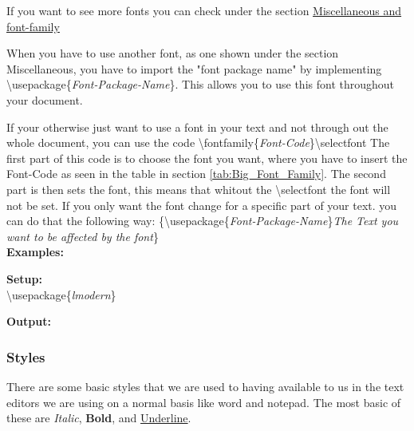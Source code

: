 \documentclass{article}
\newcommand{\bs}[1]{\textbackslash{}#1} %
\begin{document}
If you want to see more fonts you can check under the section  \hyperref[secc:font-family-sheet]{Miscellaneous and font-family}

When you have to use another font, as one shown under the section Miscellaneous, you have to import the "font package name" by implementing \bs{usepackage\{\textit{Font-Package-Name}\}}.
This allows you to use this font throughout your document.

If your otherwise just want to use a font in your text and not through out the whole document, you can use the code \bs{fontfamily\{\textit{Font-Code}\}}\bs{selectfont}
The first part of this code is to choose the font you want, where you have to insert the Font-Code as seen in the table in section \ref{tab:Big_Font_Family}.
The second part is then sets the font, this means that whitout the \bs{selectfont} the font will not be set. If you only want the font change for a specific part
of your text. you can do that the following way: \{\bs{usepackage\{\textit{Font-Package-Name}\}}\textit{The Text you want to be affected by the font}\} \\

{\large\textbf{Examples:}}
\begin{multicols}{2}
    \noindent
    \vspace{0.5em}
    \textbf{Setup:} \\
    \bs{usepackage}\{\textit{lmodern}\}
    \vspace{1em}

    \noindent
    \vspace{0.5em}
    \textbf{Output:} \\
    \vspace{1em}

\end{multicols}

\subsubsection{Styles}\label{subsubsec:text_styles}
There are some basic styles that we are used to having available to us in the text editors we are using on a normal basis like word and notepad.
The most basic of these are \textit{Italic}, \textbf{Bold}, and \underline{Underline}. 
\end{document}
